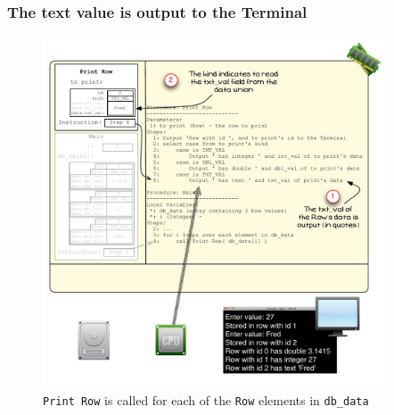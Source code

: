 
\clearpage
\subsubsection{The text value is output to the Terminal} %
\label{ssub:the_text_value_is_output_to_the_terminal}

\begin{figure}[htbp]
   \centering
   \includegraphics[width=0.91\textwidth]{./topics/type-decl/images/PrintRow2} 
 \caption{\texttt{Print Row} is called for each of the \texttt{Row} elements in \texttt{db\_data}}
 \label{fig:print-row-vis-2}
\end{figure}

